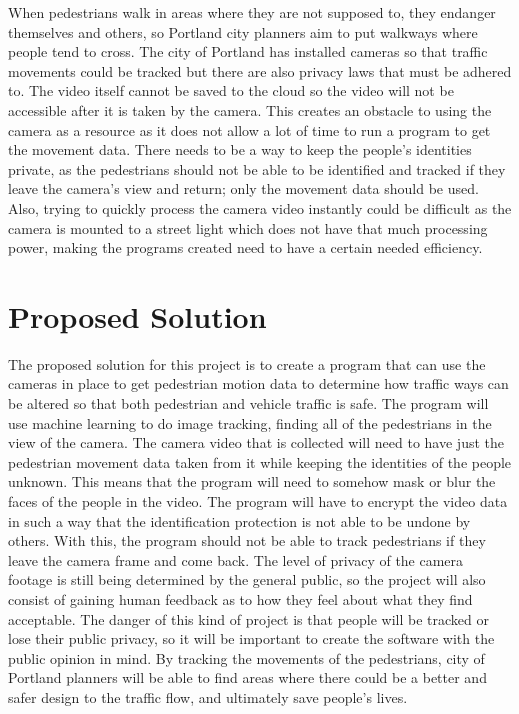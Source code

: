 \documentclass[letterpaper,10pt]{article}
\begin{document}
When pedestrians walk in areas where they are not supposed to, they endanger themselves and others, so Portland city planners aim to put walkways where people tend to cross. The city of Portland has installed cameras so that traffic movements could be tracked but there are also privacy laws that must be adhered to. The video itself cannot be saved to the cloud so the video will not be accessible after it is taken by the camera. This creates an obstacle to using the camera as a resource as it does not allow a lot of time to run a program to get the movement data. There needs to be a way to keep the people’s identities private, as the pedestrians should not be able to be identified and tracked if they leave the camera’s view and return; only the movement data should be used. Also, trying to quickly process the camera video instantly could be difficult as the camera is mounted to a street light which does not have that much processing power, making the programs created need to have a certain needed efficiency. 

\section{Proposed Solution}
The proposed solution for this project is to create a program that can use the cameras in place to get pedestrian motion data to determine how traffic ways can be altered so that both pedestrian and vehicle traffic is safe. The program will use machine learning to do image tracking, finding all of the pedestrians in the view of the camera. The camera video that is collected will need to have just the pedestrian movement data taken from it while keeping the identities of the people unknown. This means that the program will need to somehow mask or blur the faces of the people in the video. The program will have to encrypt the video data in such a way that the identification protection is not able to be undone by others. With this, the program should not be able to track pedestrians if they leave the camera frame and come back. The level of privacy of the camera footage is still being determined by the general public, so the project will also consist of gaining human feedback as to how they feel about what they find acceptable. The danger of this kind of project is that people will be tracked or lose their public privacy, so it will be important to create the software with the public opinion in mind. By tracking the movements of the pedestrians, city of Portland planners will be able to find areas where there could be a better and safer design to the traffic flow, and ultimately save people’s lives.
\end{document}
